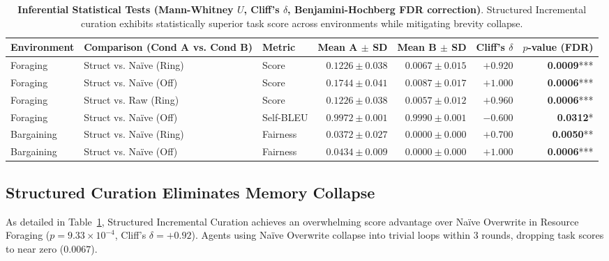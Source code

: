 \documentclass[11pt,a4paper]{article}
\begin{document}
\begin{table}[t]
\centering
\small
\begin{tabular}{lllrrrr}
\toprule
\textbf{Environment} & \textbf{Comparison (Cond A vs. Cond B)} & \textbf{Metric} & \textbf{Mean A $\pm$ SD} & \textbf{Mean B $\pm$ SD} & \textbf{Cliff's $\delta$} & \textbf{$p$-value (FDR)} \\
\midrule
Foraging & Struct vs. Naïve (Ring) & Score & $0.1226 \pm 0.038$ & $0.0067 \pm 0.015$ & $+0.920$ & \textbf{0.0009}*** \\
Foraging & Struct vs. Naïve (Off) & Score & $0.1744 \pm 0.041$ & $0.0087 \pm 0.017$ & $+1.000$ & \textbf{0.0006}*** \\
Foraging & Struct vs. Raw (Ring) & Score & $0.1226 \pm 0.038$ & $0.0057 \pm 0.012$ & $+0.960$ & \textbf{0.0006}*** \\
Foraging & Struct vs. Naïve (Off) & Self-BLEU & $0.9972 \pm 0.001$ & $0.9990 \pm 0.001$ & $-0.600$ & \textbf{0.0312}* \\
\midrule
Bargaining & Struct vs. Naïve (Ring) & Fairness & $0.0372 \pm 0.027$ & $0.0000 \pm 0.000$ & $+0.700$ & \textbf{0.0050}** \\
Bargaining & Struct vs. Naïve (Off) & Fairness & $0.0434 \pm 0.009$ & $0.0000 \pm 0.000$ & $+1.000$ & \textbf{0.0006}*** \\
\bottomrule
\end{tabular}
\caption{\textbf{Inferential Statistical Tests (Mann-Whitney $U$, Cliff's $\delta$, Benjamini-Hochberg FDR correction)}. Structured Incremental curation exhibits statistically superior task score across environments while mitigating brevity collapse.}
\label{tab:significance}
\end{table}

\subsection{Structured Curation Eliminates Memory Collapse}
As detailed in Table~\ref{tab:significance}, Structured Incremental Curation achieves an overwhelming score advantage over Naïve Overwrite in Resource Foraging ($p = 9.33 \times 10^{-4}$, Cliff's $\delta = +0.92$). Agents using Naïve Overwrite collapse into trivial loops within $3$ rounds, dropping task scores to near zero ($0.0067$).
\end{document}

